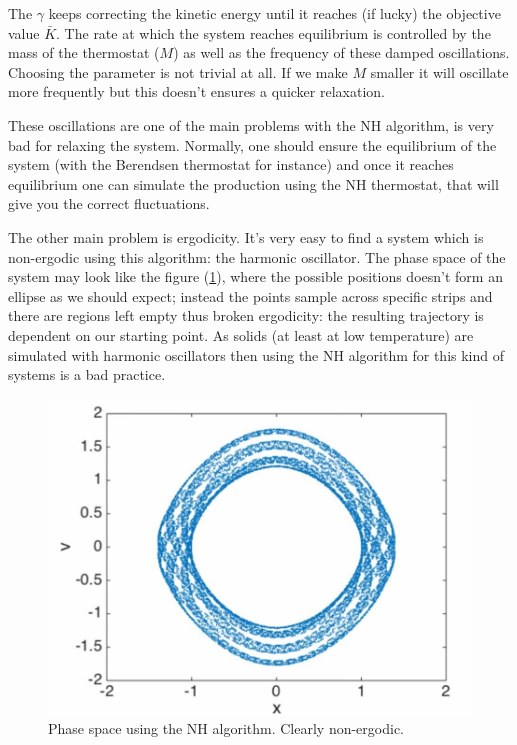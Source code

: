 \par The $\gamma$ keeps correcting the kinetic energy until it reaches (if lucky) the objective value $\bar{K}$. The rate at which the system reaches equilibrium is controlled by the mass of the thermostat ($M$) as well as the frequency of these damped oscillations. Choosing the parameter is not trivial at all. If we make $M$ smaller it will oscillate more frequently but this doesn't ensures a quicker relaxation.
\par These oscillations are one of the main problems with the NH algorithm, is very bad for relaxing the system. 
Normally, one should ensure the equilibrium of the system (with the Berendsen thermostat for instance) and once it reaches equilibrium one can simulate the production using the NH thermostat, that will give you the correct fluctuations. 

\par The other main problem is ergodicity. It's very easy to find a system which is non-ergodic using this algorithm: the harmonic oscillator. The phase space of the system may look like the figure (\ref{psnh}), where the possible positions doesn't form an ellipse as we should expect; instead the points sample across specific strips and there are regions left empty thus broken ergodicity: the resulting trajectory is dependent on our starting point. As solids (at least at low temperature) are simulated with harmonic oscillators then using the NH algorithm for this kind of systems is a bad practice. 

\begin{figure}[h!]
    \centering
    \includegraphics[scale = 0.5]{Thermostats/psnh.jpg}
    \caption{Phase space using the NH algorithm. Clearly non-ergodic.}
    \label{psnh}
\end{figure}


